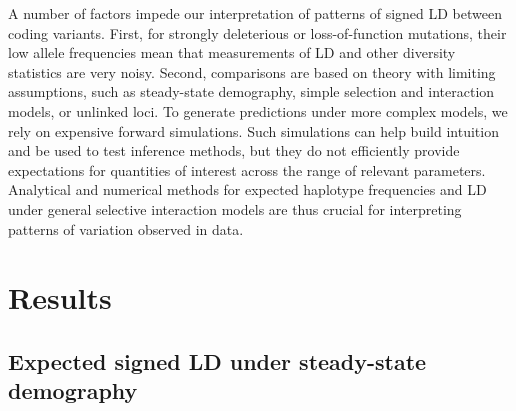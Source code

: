 \documentclass[]{article}
\begin{document}
A number of factors impede our interpretation of patterns of signed LD between
coding variants. First, for strongly deleterious or loss-of-function mutations,
their low allele frequencies mean that measurements of LD and other diversity
statistics are very noisy. Second, comparisons are based on theory with
limiting assumptions, such as steady-state demography, simple selection and
interaction models, or unlinked loci. To generate predictions under more
complex models, we rely on expensive forward simulations. Such simulations can
help build intuition and be used to test inference methods, but they do not
efficiently provide expectations for quantities of interest across the range of
relevant parameters. Analytical and numerical methods for expected haplotype
frequencies and LD under general selective interaction models are thus crucial
for interpreting patterns of variation observed in data.

\section{Results}\label{sec:results}

\subsection{Expected signed LD under steady-state demography}
\label{sec:signed-ld}
\end{document}
